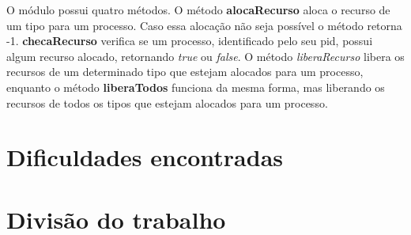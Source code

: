 \documentclass[a4paper]{article}
\begin{document}
	O módulo possui quatro métodos. O método \textbf{alocaRecurso} aloca o recurso de um tipo para um processo. Caso essa alocação não seja possível o método retorna -1. \textbf{checaRecurso} verifica se um processo, identificado pelo seu pid, possui algum recurso alocado, retornando \emph{true} ou \emph{false}. O método \emph{liberaRecurso} libera os recursos de um determinado tipo que estejam alocados para um processo, enquanto o método \textbf{liberaTodos} funciona da mesma forma, mas liberando os recursos de todos os tipos que estejam alocados para um processo.
	
\section{Dificuldades encontradas}

\section{Divisão do trabalho}


\end{document}
